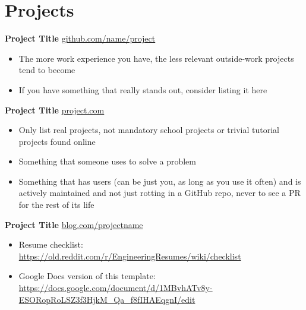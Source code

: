 \documentclass[11pt]{article}       %
\begin{document}

\vspace{-18.5pt}

\section*{Projects}
\textbf{Project Title} \hfill \href{https://github.com/matiassingers/awesome-readme}{github.com/name/project} \\
\vspace{-9pt}
\begin{itemize}
  \item The more work experience you have, the less relevant outside-work projects tend to become
  \item If you have something that really stands out, consider listing it here
\end{itemize}

\textbf{Project Title} \hfill \href{https://mitcommlab.mit.edu/meche/commkit/portfolio/}{project.com} \\
\vspace{-9pt}
\begin{itemize}
  \item Only list real projects, not mandatory school projects or trivial tutorial projects found online 
  \item Something that someone uses to solve a problem
  \item Something that has users (can be just you, as long as you use it often) and is actively maintained and not just rotting in a GitHub repo, never to see a PR for the rest of its life
\end{itemize}

\textbf{Project Title} \hfill \href{https://www.hardwareishard.net/portfolio-database}{blog.com/projectname} \\
\vspace{-9pt}
\begin{itemize}
  \item Resume checklist: \url{https://old.reddit.com/r/EngineeringResumes/wiki/checklist}
  \item Google Docs version of this template: \url{https://docs.google.com/document/d/1MBvhATv8y-ESORopRoLSZ3f3HjkM_Qa_f8fIHAEqgnI/edit}
\end{itemize}
\end{document}

